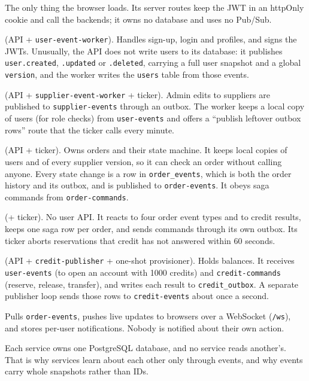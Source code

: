 \documentclass[11pt,a4paper]{article}
\newcommand{\code}[1]{\nolinkurl{#1}}
\begin{document}
\begin{description}[leftmargin=0pt, labelsep=0.4em, itemsep=2pt, font=\bfseries]
\item[frontend-service (Nuxt).] The only thing the browser loads. Its server routes keep the JWT in
an httpOnly cookie and call the backends; it owns no database and uses no Pub/Sub.
\item[user-service] (API + \code{user-event-worker}). Handles sign-up, login and profiles, and
signs the JWTs. Unusually, the API does not write users to its database: it publishes
\code{user.created}, \code{.updated} or \code{.deleted}, carrying a full user snapshot and a
global \code{version}, and the worker writes the \code{users} table from those events.
\item[supplier-service] (API + \code{supplier-event-worker} + ticker). Admin edits to suppliers
are published to \code{supplier-events} through an outbox. The worker keeps a local copy of users
(for role checks) from \code{user-events} and offers a ``publish leftover outbox rows'' route that
the ticker calls every minute.
\item[order-service] (API + ticker). Owns orders and their state machine. It keeps local copies
of users and of every supplier version, so it can check an order without calling anyone. Every
state change is a row in \code{order_events}, which is both the order history and its outbox, and
is published to \code{order-events}. It obeys saga commands from \code{order-commands}.
\item[saga-orchestrator] (+ ticker). No user API. It reacts to four order event types and to
credit results, keeps one saga row per order, and sends commands through its own outbox. Its
ticker aborts reservations that credit has not answered within 60 seconds.
\item[credit-service] (API + \code{credit-publisher} + one-shot provisioner). Holds balances.
It receives \code{user-events} (to open an account with 1000 credits) and \code{credit-commands}
(reserve, release, transfer), and writes each result to \code{credit_outbox}. A separate
publisher loop sends those rows to \code{credit-events} about once a second.
\item[notification-service.] Pulls \code{order-events}, pushes live updates to browsers over a
WebSocket (\code{/ws}), and stores per-user notifications. Nobody is notified about their own
action.
\end{description}
Each service owns one PostgreSQL database, and no service reads another's. That is why services
learn about each other only through events, and why events carry whole snapshots rather than IDs.
\end{document}
